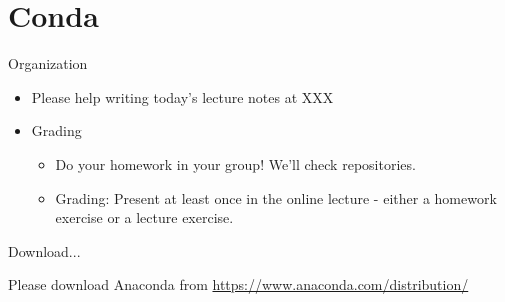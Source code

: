 
\subtitle{Installation of Python using Conda and first steps in Python}
\date{2020-03-26}


\begin{frame}
	\tableofcontents
\end{frame}

\section{Conda}

\begin{frame}{Organization}

	\begin{itemize}
		\item Please help writing today's lecture notes at XXX
		\item Grading
			\begin{itemize}
				\item Do your homework in your group! We'll check repositories.
				\item Grading: Present at least once in the online lecture - either a homework exercise or a lecture exercise.
			\end{itemize}
	\end{itemize}
\end{frame}

\begin{frame}{Download...}

	Please download Anaconda from
	\href{https://www.anaconda.com/distribution/}{https://www.anaconda.com/distribution/}\\

\end{frame}


